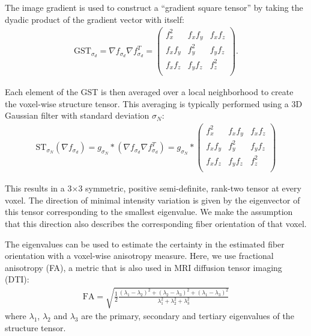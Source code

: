 \documentclass[11pt]{article}
\begin{document}
The image gradient is used to construct a ``gradient square tensor'' by taking
the dyadic product of the gradient vector with itself:
\begin{align}
  \label{eq:GST}
  \text{GST}_{\sigma_d} = \nabla f_{\sigma_d} \nabla f_{\sigma_d}^T =
  \begin{pmatrix}
    f_x^2 & f_x f_y & f_x f_z \\
    f_x f_y & f_y^2 & f_y f_z \\
    f_x f_z & f_y f_z & f_z^2 \\
  \end{pmatrix}.
\end{align}

Each element of the GST is then averaged over a local neighborhood to create the
voxel-wise structure tensor. This averaging is typically performed using a 3D
Gaussian filter with standard deviation $\sigma_N$:
\begin{align}
  \label{eq:ST}
  \text{ST}_{\sigma_N}\left(\nabla f_{\sigma_d}\right) = g_{\sigma_N} \ast
  \left(\nabla f_{\sigma_d} \nabla f_{\sigma_d}^T \right) = g_{\sigma_N} \ast
  \begin{pmatrix}
    f_x^2 & f_x f_y & f_x f_z \\
    f_x f_y & f_y^2 & f_y f_z \\
    f_x f_z & f_y f_z & f_z^2 \\
  \end{pmatrix}
\end{align}

This results in a 3$\times$3 symmetric, positive semi-definite, rank-two tensor
at every voxel. The direction of minimal intensity variation is given by the
eigenvector of this tensor corresponding to the smallest eigenvalue. We make the
assumption that this direction also describes the corresponding fiber
orientation of that voxel.

The eigenvalues can be used to estimate the certainty in the estimated fiber
orientation with a voxel-wise anisotropy measure. Here, we use fractional
anisotropy (FA), a metric that is also used in MRI diffusion tensor imaging (DTI):
\begin{align}
  \label{eq:FA}
  \text{FA} = \sqrt{\frac{1}{2}\frac{(\lambda_1-\lambda_2)^2 + (\lambda_2-\lambda_3)^2 +
      (\lambda_1 - \lambda_3)^2}{\lambda_1^2 + \lambda_2^2 + \lambda_3^2}}
\end{align}
where $\lambda_1$, $\lambda_2$ and $\lambda_3$ are the primary, secondary and
tertiary eigenvalues of the structure tensor.
\end{document}
